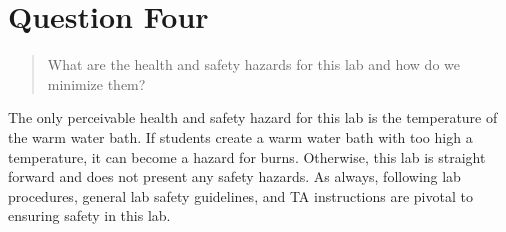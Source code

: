 \documentclass[11pt, letterpaper]{article}
\begin{document}
\section{Question Four}
\begin{quote}
    What are the health and safety hazards for this lab and how do we minimize them?
\end{quote}

The only perceivable health and safety hazard for this lab is the temperature of the 
warm water bath. If students create a warm water bath with too high a temperature,
it can become a hazard for burns. 
Otherwise, this lab is straight forward and does not present any safety hazards.
As always, following lab procedures, general lab safety guidelines, and TA instructions
are pivotal to ensuring safety in this lab.
\end{document}
